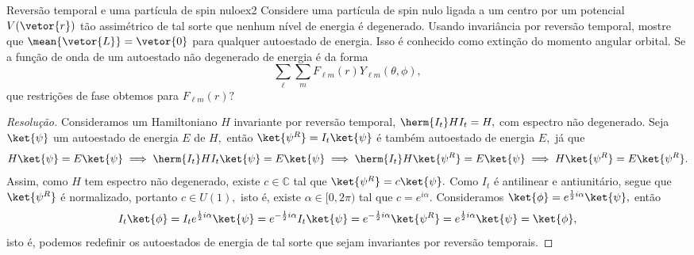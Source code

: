 \begin{exercício}{Reversão temporal e uma partícula de spin nulo}{ex2}
    Considere uma partícula de spin nulo ligada a um centro por um potencial \(V(\vetor{r})\) tão assimétrico de tal sorte que nenhum nível de energia é degenerado. Usando invariância por reversão temporal, mostre que \(\mean{\vetor{L}} = \vetor{0}\) para qualquer autoestado de energia. Isso é conhecido como extinção do momento angular orbital. Se a função de onda de um autoestado não degenerado de energia é da forma
    \begin{equation*}
        \sum_{\ell} \sum_m F_{\ell m}(r) Y_{\ell m}(\theta, \phi),
    \end{equation*}
    que restrições de fase obtemos para \(F_{\ell m}(r)?\)
\end{exercício}
\begin{proof}[Resolução]
    Consideramos um Hamiltoniano \(H\) invariante por reversão temporal, \(\herm{I_t} H I_t = H,\) com espectro não degenerado. Seja \(\ket{\psi}\) um autoestado de energia \(E\) de \(H,\) então \(\ket{\psi^R} = I_t \ket{\psi}\) é também autoestado de energia \(E,\) já que
    \begin{equation*}
        H \ket{\psi} = E \ket{\psi} \implies \herm{I_t} H I_t \ket{\psi} = E \ket{\psi} \implies \herm{I_t} H \ket{\psi^R} = E \ket{\psi} \implies H \ket{\psi^R} = E \ket{\psi^R}.
    \end{equation*}
    Assim, como \(H\) tem espectro não degenerado, existe \(c \in \mathbb{C}\) tal que \(\ket{\psi^R} = c\ket{\psi}.\) Como \(I_t\) é antilinear e antiunitário, segue que \(\ket{\psi^R}\) é normalizado, portanto \(c \in U(1),\) isto é, existe \(\alpha \in [0, 2\pi)\) tal que \(c = e^{i \alpha}.\) Consideramos \(\ket{\phi} = e^{\frac12 i \alpha} \ket{\psi},\) então
    \begin{equation*}
        I_t \ket{\phi} = I_t e^{\frac12 i \alpha} \ket{\psi} = e^{-\frac12 i \alpha} I_t \ket{\psi} = e^{-\frac12 i \alpha} \ket{\psi^R} = e^{\frac12 i \alpha} \ket{\psi} = \ket{\phi},
    \end{equation*}
    isto é, podemos redefinir os autoestados de energia de tal sorte que sejam invariantes por reversão temporais.


\end{proof}
